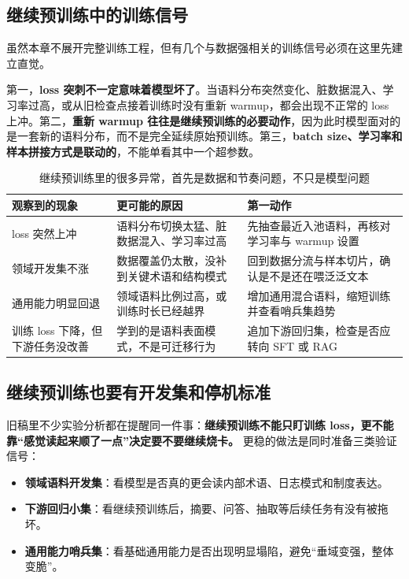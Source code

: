 \subsection{继续预训练中的训练信号}
虽然本章不展开完整训练工程，但有几个与数据强相关的训练信号必须在这里先建立直觉。

第一，\textbf{loss 突刺不一定意味着模型坏了}。当语料分布突然变化、脏数据混入、学习率过高，或从旧检查点接着训练时没有重新 warmup，都会出现不正常的 loss 上冲。第二，\textbf{重新 warmup 往往是继续预训练的必要动作}，因为此时模型面对的是一套新的语料分布，而不是完全延续原始预训练。第三，\textbf{batch size、学习率和样本拼接方式是联动的}，不能单看其中一个超参数。

\begin{table}[H]
\centering
\small
\begin{tabularx}{\textwidth}{>{\raggedright\arraybackslash}p{3cm}>{\raggedright\arraybackslash}p{3.5cm}>{\raggedright\arraybackslash}X}
\toprule
\textbf{观察到的现象} & \textbf{更可能的原因} & \textbf{第一动作} \\
\midrule
loss 突然上冲 & 语料分布切换太猛、脏数据混入、学习率过高 & 先抽查最近入池语料，再核对学习率与 warmup 设置 \\
领域开发集不涨 & 数据覆盖仍太散，没补到关键术语和结构模式 & 回到数据分流与样本切片，确认是不是还在喂泛泛文本 \\
通用能力明显回退 & 领域语料比例过高，或训练时长已经越界 & 增加通用混合语料，缩短训练并查看哨兵集趋势 \\
训练 loss 下降，但下游任务没改善 & 学到的是语料表面模式，不是可迁移行为 & 追加下游回归集，检查是否应转向 SFT 或 RAG \\
\bottomrule
\end{tabularx}
\caption{继续预训练里的很多异常，首先是数据和节奏问题，不只是模型问题}
\label{tab:cpt-signal-diagnosis}
\end{table}

\subsection{继续预训练也要有开发集和停机标准}
旧稿里不少实验分析都在提醒同一件事：\textbf{继续预训练不能只盯训练 loss，更不能靠“感觉读起来顺了一点”决定要不要继续烧卡。} 更稳的做法是同时准备三类验证信号：
\begin{itemize}
  \item \textbf{领域语料开发集}：看模型是否真的更会读内部术语、日志模式和制度表达。
  \item \textbf{下游回归小集}：看继续预训练后，摘要、问答、抽取等后续任务有没有被拖坏。
  \item \textbf{通用能力哨兵集}：看基础通用能力是否出现明显塌陷，避免“垂域变强，整体变脆”。
\end{itemize}

